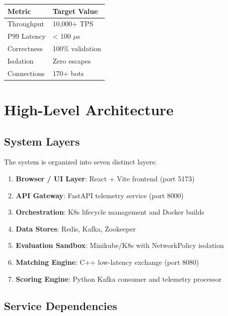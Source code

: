 \documentclass[10pt,a4paper,oneside]{report}
\begin{document}
\begin{table}[H]\small
    \centering
    \begin{tabular}{ll}
    \toprule
    \textbf{Metric} & \textbf{Target Value} \\
    \midrule
    Throughput & 10,000+ TPS \\
    P99 Latency & < 100 $\mu$s \\
    Correctness & 100\% validation \\
    Isolation & Zero escapes \\
    Connections & 170+ bots \\
    \bottomrule
    \end{tabular}
\end{table}

\chapter{High-Level Architecture}

\section{System Layers}

The system is organized into seven distinct layers:

\begin{enumerate}
    \item \textbf{Browser / UI Layer}: React + Vite frontend (port 5173)
    \item \textbf{API Gateway}: FastAPI telemetry service (port 8000)
    \item \textbf{Orchestration}: K8s lifecycle management and Docker builds
    \item \textbf{Data Stores}: Redis, Kafka, Zookeeper
    \item \textbf{Evaluation Sandbox}: Minikube/K8s with NetworkPolicy isolation
    \item \textbf{Matching Engine}: C++ low-latency exchange (port 8080)
    \item \textbf{Scoring Engine}: Python Kafka consumer and telemetry processor
\end{enumerate}

\section{Service Dependencies}
\end{document}
